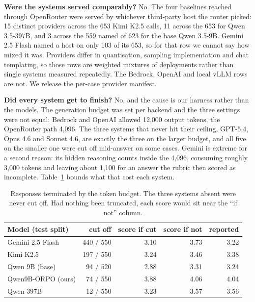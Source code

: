 \documentclass[11pt]{article}
\begin{document}
\textbf{Were the systems served comparably?} No. The four baselines reached
through OpenRouter were served by whichever third-party host the router picked:
15 distinct providers across the 653 Kimi K2.5 calls, 11 across the 653 for Qwen
3.5-397B, and 3 across the 559 named of 623 for the base Qwen 3.5-9B. Gemini 2.5
Flash named a host on only 103 of its 653, so for that row we cannot say how
mixed it was. Providers differ in quantisation, sampling implementation and chat
templating, so those rows are weighted mixtures of deployments rather than single
systems measured repeatedly. The Bedrock, OpenAI and local vLLM rows are not. We
release the per-case provider manifest.

\textbf{Did every system get to finish?} No, and the cause is our harness rather
than the models. The generation budget was set per backend and the three settings
were not equal: Bedrock and OpenAI allowed 12,000 output tokens, the OpenRouter
path 4,096. The three systems that never hit their ceiling, GPT-5.4,
Opus 4.6 and Sonnet 4.6, are exactly the three on the larger budget, and all five
on the smaller one were cut off mid-answer on some cases. Gemini is extreme for a
second reason: its hidden reasoning counts inside the 4,096, consuming roughly
3,000 tokens and leaving about 1,100 for an answer the rubric then scored as
incomplete. Table~\ref{tab:truncation} bounds what that cost each system.

\begin{table}[H]
\centering
\small
\begin{tabular}{lrrrr}
\toprule
\textbf{Model (test split)} & \textbf{cut off} & \textbf{score if cut} &
\textbf{score if not} & \textbf{reported} \\
\midrule
Gemini 2.5 Flash & 440 / 550 & 3.10 & 3.73 & 3.22 \\
Kimi K2.5        & 197 / 550 & 3.24 & 3.46 & 3.38 \\
Qwen 9B (base)   &  94 / 520 & 2.88 & 3.31 & 3.24 \\
Qwen9B-ORPO (ours) & 74 / 550 & 3.88 & 4.06 & 4.04 \\
Qwen 397B        &  12 / 550 & 3.23 & 3.57 & 3.56 \\
\bottomrule
\end{tabular}
\caption{Responses terminated by the token budget. The three systems absent were
never cut off. Had nothing been truncated, each score would sit near the ``if
not'' column.}
\label{tab:truncation}
\end{table}
\end{document}
